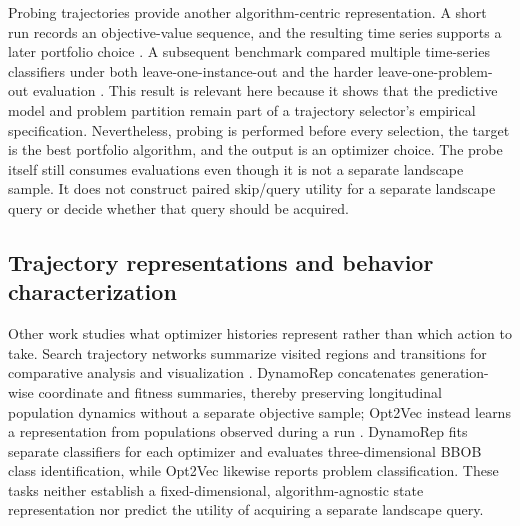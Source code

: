 Probing trajectories provide another algorithm-centric representation.  A
short run records an objective-value sequence, and the resulting time series
supports a later portfolio choice
\cite{renauUtilityProbingTrajectories2024}.
A subsequent benchmark compared multiple time-series classifiers under both
leave-one-instance-out and the harder leave-one-problem-out evaluation
\cite{renauAlgorithmSelectionProbing2025b}.  This result is relevant here
because it shows that the predictive model and problem partition remain part
of a trajectory selector's empirical specification.  Nevertheless, probing is
performed before every selection, the target is the best portfolio algorithm,
and the output is an optimizer choice.  The probe itself still consumes
evaluations even though it is not a separate landscape sample.  It does not construct paired
skip/query utility for a separate landscape query or decide whether that query
should be acquired.

\subsection{Trajectory representations and behavior characterization}

Other work studies what optimizer histories represent rather than which action
to take.  Search trajectory networks summarize visited regions and transitions
for comparative analysis and visualization \cite{ochoaSearchTrajectoryNetworks2021}.
DynamoRep concatenates generation-wise coordinate and fitness summaries, thereby
preserving longitudinal population dynamics without a separate objective sample;
Opt2Vec instead learns a representation from populations observed during a run
\cite{cenikjDynamoRepTrajectoryBasedPopulation2023,korosecOpt2VecContinuousOptimization2024}.
DynamoRep fits separate classifiers for each optimizer and evaluates
three-dimensional BBOB class identification, while Opt2Vec likewise reports
problem classification.  These tasks neither establish a fixed-dimensional,
algorithm-agnostic state representation nor predict the utility of acquiring a
separate landscape query.

